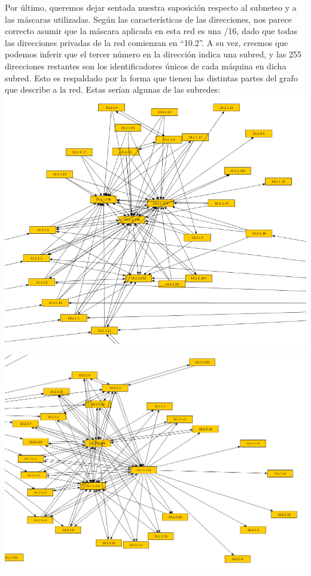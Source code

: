 \newpage
\indent Por último, queremos dejar sentada nuestra suposición respecto al subneteo y a las máscaras utilizadas. Según las características de las direcciones, nos parece correcto asumir que la máscara aplicada en esta red es una /16, dado que todas las direcciones privadas de la red comienzan en ``10.2''. A su vez, creemos que podemos inferir que el tercer número en la dirección indica una subred, y las 255 direcciones restantes son los identificadores únicos de cada máquina en dicha subred. Esto es respaldado por la forma que tienen las distintas partes del grafo que describe a la red. Estas serían algunas de las subredes:\\

\includegraphics[scale=0.5,clip=true,trim=140 0 0 0]{graphics/subnet_1.png}

\includegraphics[scale=0.5,clip=true,trim=140 0 0 0]{graphics/subnet_5.png}